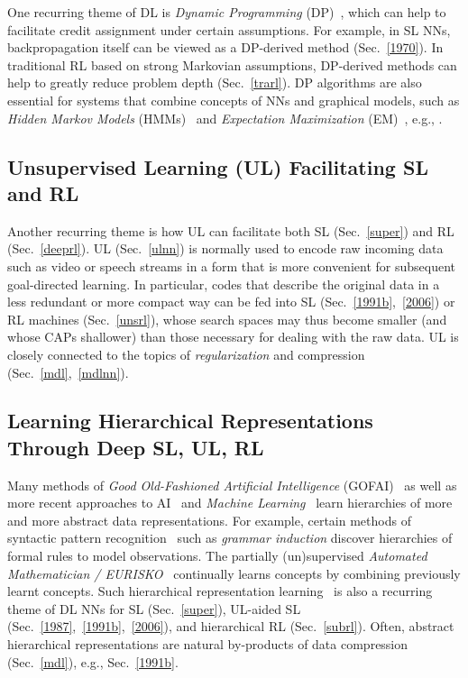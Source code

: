 \documentclass[letterpaper]{article}
\begin{document}
\begin{CJK*}{UTF8}{gbsn}
One recurring theme of DL is
{\em Dynamic Programming} (DP)~\citep{Bellman:1957},
which  can help to facilitate credit assignment
under certain assumptions. For example, 
in SL NNs, backpropagation itself can be viewed as a DP-derived method (Sec.~\ref{1970}).
In traditional RL based on strong Markovian assumptions,
DP-derived methods can help to greatly reduce problem depth (Sec.~\ref{trarl}). 
DP algorithms are also essential for systems that combine concepts of NNs and
graphical models, such as {\em Hidden Markov
Models} (HMMs)~\citep{stratonovich1960,baum1966}
and {\em Expectation Maximization} (EM)~\citep{dempster77,friedman2001}, e.g., \citep{bottou91,bengio91,bourlard+morgan:1994,baldichauvin96,jordan2001,bishop:2006,hastie2009,domingos2011,dahl2012,speech2012,diwu2014}.



\subsection{Unsupervised Learning (UL) Facilitating SL and RL}
\label{ul}

Another recurring theme is how 
UL 
can facilitate both SL (Sec.~\ref{super}) and RL (Sec.~\ref{deeprl}).
UL (Sec.~\ref{ulnn}) is normally used to 
encode raw incoming data such as video or speech streams
in a form that is more convenient for subsequent goal-directed learning.
In particular, codes that describe the original data in a less redundant or more compact way
can be fed into SL (Sec.~\ref{1991b},~\ref{2006})
or RL machines (Sec.~\ref{unsrl}), whose
search spaces may thus become smaller 
(and whose CAPs shallower)
than those necessary for dealing with the raw data.
UL is closely 
connected to the topics of 
{\em regularization} 
and compression (Sec.~\ref{mdl},~\ref{mdlnn}).

\subsection{Learning Hierarchical Representations Through Deep SL, UL, RL}
\label{hie}

Many methods of 
{\em  Good Old-Fashioned Artificial Intelligence} (GOFAI)~\citep{Nilsson:80} 
as well as more recent approaches to AI~\citep{russell1995} and {\em Machine Learning}~\citep{Mitchell:97} 
learn hierarchies of more and more abstract data representations.
For example, certain methods of syntactic pattern recognition~\citep{Fu:77} such as
{\em grammar induction} discover hierarchies of  
formal rules to model observations.
The partially (un)supervised
{\em Automated Mathematician / EURISKO}~\citep{Lenat:83,Lenat:84} continually learns   
concepts by combining previously learnt concepts.
Such hierarchical representation learning~\citep{Ring:94,bengio2013tpami,lideng2014} is also a recurring theme of
DL NNs for SL (Sec.~\ref{super}), 
UL-aided SL (Sec.~\ref{1987},~\ref{1991b},~\ref{2006}), 
and hierarchical RL (Sec.~\ref{subrl}).
Often, abstract hierarchical representations are natural by-products of
data compression (Sec.~\ref{mdl}), e.g., Sec.~\ref{1991b}. 



\end{CJK*}
\end{document}
